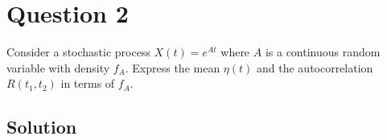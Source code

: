 \section*{Question 2}

Consider a stochastic process \( X(t)=e^{A t} \) where \( A \) is a continuous random variable with density \( f_{A} \).
Express the mean \( \eta(t) \) and the autocorrelation \( R\left(t_{1}, t_{2}\right) \) in terms of \( f_{A} \).

\subsection*{Solution}
